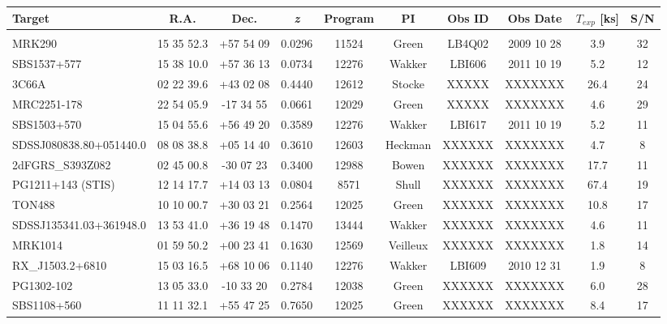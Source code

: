 \documentclass[iop]{emulateapj-rtx4}
\begin{document}
\begin{table}[ht]\footnotesize
\begin{center}
\begin{tabular}{l c c c c c c c c c}
 \hline \hline
  Target & R.A. & Dec. & \textit{z} & Program & PI & Obs ID & Obs Date & $T_{exp}$ [ks] & S/N  \\ \hline
   
\\
 MRK290					& 15 35 52.3  &  +57 54 09  &  0.0296  & 11524 & Green       & LB4Q02 & 2009 10 28 &   3.9 &  32  \\
 SBS1537+577 			& 15 38 10.0  &  +57 36 13  &  0.0734  & 12276 & Wakker     & LBI606   & 2011 10 19 &   5.2 &  12  \\
 3C66A 					& 02 22 39.6  &  +43 02 08  &  0.4440  & 12612 & Stocke	     & XXXXX   &  XXXXXXX  & 26.4 &  24  \\
 MRC2251-178 			& 22 54 05.9  &  -17 34 55   &  0.0661  & 12029 & Green       & XXXXX   & XXXXXXX   &   4.6 &  29  \\
 SBS1503+570 			& 15 04 55.6  &  +56 49 20  &  0.3589  & 12276 & Wakker     & LBI617   & 2011 10 19 &   5.2 & 11  \\
 SDSSJ080838.80+051440.0 	& 08 08 38.8  &  +05 14 40  &  0.3610  & 12603 & Heckman & XXXXXX & XXXXXXX  &    4.7 &  8  \\
 2dFGRS\_S393Z082 		& 02 45 00.8  &  -30 07 23   &  0.3400  & 12988 & Bowen      & XXXXXX & XXXXXXX  & 17.7 & 11  \\ 
 PG1211+143 (STIS)		& 12 14 17.7  &  +14 03 13  &  0.0804  &  8571 & Shull           & XXXXXX & XXXXXXX  & 67.4 &  19  \\ 
 TON488 					& 10 10 00.7  &  +30 03 21  &  0.2564  & 12025 & Green       & XXXXXX & XXXXXXX  &  10.8  &  17  \\
 SDSSJ135341.03+361948.0 	& 13 53 41.0  &  +36 19 48  &  0.1470  & 13444 & Wakker     & XXXXXX & XXXXXXX  &     4.6 &  11  \\
 MRK1014 				& 01 59 50.2  &  +00 23 41  &  0.1630  &12569 & Veilleux     & XXXXXX & XXXXXXX  &     1.8 &  14  \\
 RX\_J1503.2+6810 	 		& 15 03 16.5  &  +68 10 06  &  0.1140  & 12276 & Wakker     & LBI609   & 2010 12 31 &     1.9 &  8  \\
 PG1302-102 				& 13 05 33.0  &  -10 33 20   &  0.2784  & 12038 & Green	     & XXXXXX & XXXXXXX  &     6.0 &  28  \\
 SBS1108+560 			& 11 11 32.1  &  +55 47 25  &  0.7650  & 12025 & Green	     & XXXXXX & XXXXXXX  &     8.4 & 17  \\

\end{tabular}
\end{center}
\end{table}
\end{document}
